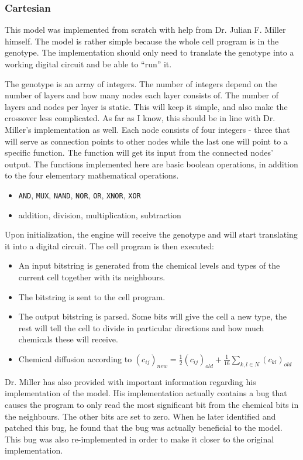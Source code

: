 \subsubsection{Cartesian}
\label{sec:cartesian}
This model was implemented from scratch with help from Dr. Julian F. Miller himself. The model is rather simple because the whole cell program is in the genotype. The implementation should only need to translate the genotype into a working digital circuit and be able to ``run'' it.

The genotype is an array of integers. The number of integers depend on the number of layers and how many nodes each layer consists of. The number of layers and nodes per layer is static. This will keep it simple, and also make the crossover less complicated. As far as I know, this should be in line with Dr. Miller's implementation as well. Each node consists of four integers - three that will serve as connection points to other nodes while the last one will point to a specific function. The function will get its input from the connected nodes' output. The functions implemented here are basic boolean operations, in addition to the four elementary mathematical operations.

\begin{itemize}
	\itemsep=0pt
	\item \texttt{AND}, \texttt{MUX}, \texttt{NAND}, \texttt{NOR}, \texttt{OR}, \texttt{XNOR}, \texttt{XOR}
	\item addition, division, multiplication, subtraction
\end{itemize}

Upon initialization, the engine will receive the genotype and will start translating it into a digital circuit. The cell program is then executed:

\begin{itemize}
	\item An input bitstring is generated from the chemical levels and types of the current cell together with its neighbours.
	\item The bitstring is sent to the cell program.
	\item The output bitstring is parsed. Some bits will give the cell a new type, the rest will tell the cell to divide in particular directions and how much chemicals these will receive.
	\item Chemical diffusion according to $(c_{ij})_{new} = \frac{1}{2}(c_{ij})_{old} + \frac{1}{16}\sum_{k, l \in N} (c_{kl})_{old}$
\end{itemize}

Dr. Miller has also provided with important information regarding his implementation of the model. His implementation actually contains a bug that causes the program to only read the most significant bit from the chemical bits in the neighbours. The other bits are set to zero. When he later identified and patched this bug, he found that the bug was actually beneficial to the model. This bug was also re-implemented in order to make it closer to the original implementation.
